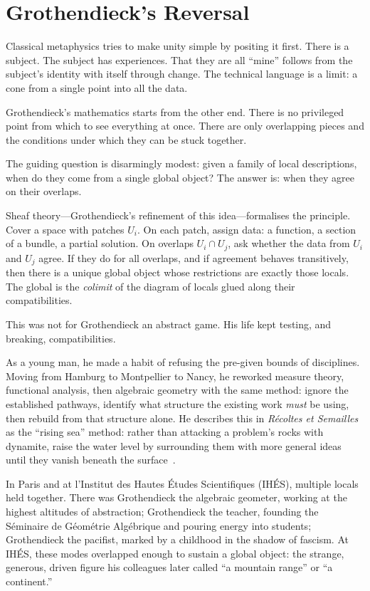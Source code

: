 \documentclass[12pt,a4paper]{article}
\begin{document}
\section{Grothendieck's Reversal}

Classical metaphysics tries to make unity simple by positing it first. There is a subject. The subject has experiences. That they are all ``mine'' follows from the subject's identity with itself through change. The technical language is a limit: a cone from a single point into all the data.

Grothendieck's mathematics starts from the other end. There is no privileged point from which to see everything at once. There are only overlapping pieces and the conditions under which they can be stuck together.

The guiding question is disarmingly modest: given a family of local descriptions, when do they come from a single global object? The answer is: when they agree on their overlaps.

Sheaf theory---Grothendieck's refinement of this idea---formalises the principle. Cover a space with patches $U_i$. On each patch, assign data: a function, a section of a bundle, a partial solution. On overlaps $U_i \cap U_j$, ask whether the data from $U_i$ and $U_j$ agree. If they do for all overlaps, and if agreement behaves transitively, then there is a unique global object whose restrictions are exactly those locals. The global is the \emph{colimit} of the diagram of locals glued along their compatibilities.

This was not for Grothendieck an abstract game. His life kept testing, and breaking, compatibilities.

As a young man, he made a habit of refusing the pre-given bounds of disciplines. Moving from Hamburg to Montpellier to Nancy, he reworked measure theory, functional analysis, then algebraic geometry with the same method: ignore the established pathways, identify what structure the existing work \emph{must} be using, then rebuild from that structure alone. He describes this in \emph{R\'ecoltes et Semailles} as the ``rising sea'' method: rather than attacking a problem's rocks with dynamite, raise the water level by surrounding them with more general ideas until they vanish beneath the surface~\cite{mclarty}.

In Paris and at l'Institut des Hautes \'Etudes Scientifiques (IH\'ES), multiple locals held together. There was Grothendieck the algebraic geometer, working at the highest altitudes of abstraction; Grothendieck the teacher, founding the S\'eminaire de G\'eom\'etrie Alg\'ebrique and pouring energy into students; Grothendieck the pacifist, marked by a childhood in the shadow of fascism. At IH\'ES, these modes overlapped enough to sustain a global object: the strange, generous, driven figure his colleagues later called ``a mountain range'' or ``a continent.''
\end{document}
